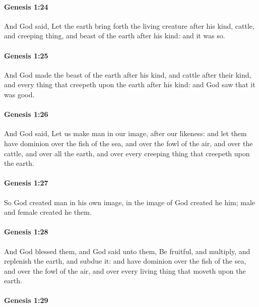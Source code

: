 		\paragraph{Genesis 1:24} %
			\label{GENESIS-1-24}

			And God said, Let the earth bring forth the living creature after his kind, cattle, and creeping thing, and beast of the earth after his kind: and it was so. 

		\paragraph{Genesis 1:25} %
			\label{GENESIS-1-25}

			And God made the beast of the earth after his kind, and cattle after their kind, and every thing that creepeth upon the earth after his kind: and God saw that it was good.

		\paragraph{Genesis 1:26} %
			\label{GENESIS-1-26}

			And God said, Let us make man in our image, after our likeness: and let them have dominion over the fish of the sea, and over the fowl of the air, and over the cattle, and over all the earth, and over every creeping thing that creepeth upon the earth. 

		\paragraph{Genesis 1:27} %
			\label{GENESIS-1-27}

			So God created man in his own image, in the image of God created he him; male and female created he them.

		\paragraph{Genesis 1:28} %
			\label{GENESIS-1-28}

			And God blessed them, and God said unto them, Be fruitful, and multiply, and replenish the earth, and subdue it: and have dominion over the fish of the sea, and over the fowl of the air, and over every living thing that moveth upon the earth. 

		\paragraph{Genesis 1:29} %
			\label{GENESIS-1-29}

